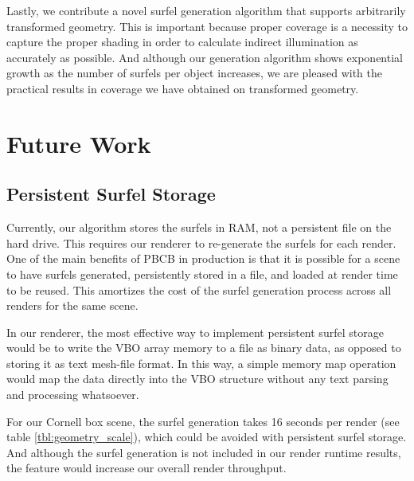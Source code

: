 Lastly, we contribute a novel surfel generation algorithm that supports arbitrarily transformed geometry. This is important because proper coverage is a necessity to capture the proper shading in order to calculate indirect illumination as accurately as possible. And although our generation algorithm shows exponential growth as the number of surfels per object increases, we are pleased with the practical results in coverage we have obtained on transformed geometry.

\section{Future Work}
\label{sec:future_work}

\subsection{Persistent Surfel Storage}
Currently, our algorithm stores the surfels in RAM, not a persistent file on the hard drive. This requires our renderer to re-generate the surfels for each render. One of the main benefits of PBCB in production is that it is possible for a scene to have surfels generated, persistently stored in a file, and loaded at render time to be reused. This amortizes the cost of the surfel generation process across all renders for the same scene.

In our renderer, the most effective way to implement persistent surfel storage would be to write the VBO array memory to a file as binary data, as opposed to storing it as text mesh-file format. In this way, a simple memory map operation would map the data directly into the VBO structure without any text parsing and processing whatsoever.

For our Cornell box scene, the surfel generation takes 16 seconds per render (see table \ref{tbl:geometry_scale}), which could be avoided with persistent surfel storage. And although the surfel generation is not included in our render runtime results, the feature would increase our overall render throughput.

